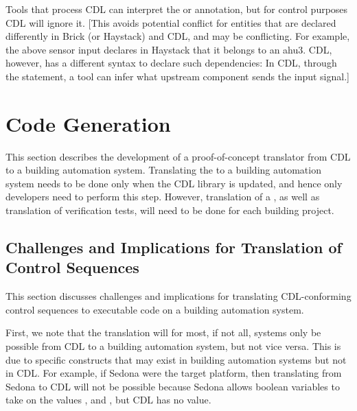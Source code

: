 \documentclass[letterpaper,10pt, openany,english]{sphinxmanual}
\begin{document}
Tools that process CDL can interpret the  or  annotation,
but for control purposes CDL will ignore it. {[}This avoids potential conflict for entities that
are declared differently in Brick (or Haystack) and CDL, and may be conflicting.
For example, the above sensor input declares in Haystack that it belongs
to an ahu3. CDL, however, has a different syntax to declare such dependencies:
In CDL, through the  statement,
a tool can infer what upstream component sends the input signal.{]}


\chapter{Code Generation}
\label{\detokenize{codeGeneration:code-generation}}\label{\detokenize{codeGeneration:sec-code-gen}}\label{\detokenize{codeGeneration::doc}}
This section describes the development of a proof-of-concept
translator from CDL to a building automation system.
Translating the  to a building automation system needs to be done only when
the CDL library is updated, and hence only developers need
to perform this step.
However, translation of a , as well as translation
of verification tests, will need to be done for each building project.


\section{Challenges and Implications for Translation of Control Sequences}
\label{\detokenize{codeGeneration:challenges-and-implications-for-translation-of-control-sequences}}
This section discusses challenges and implications
for translating CDL-conforming control
sequences to executable code on a building automation system.

First, we note that the translation will for most, if not all,
systems only be possible from CDL to a building automation system,
but not vice versa. This is due to specific constructs that may exist
in building automation systems but not in CDL.  For example,
if Sedona were the target platform, then
translating from Sedona to CDL will not be possible
because Sedona allows boolean variables
to take on the values ,  and , but
CDL has no  value.
\end{document}
